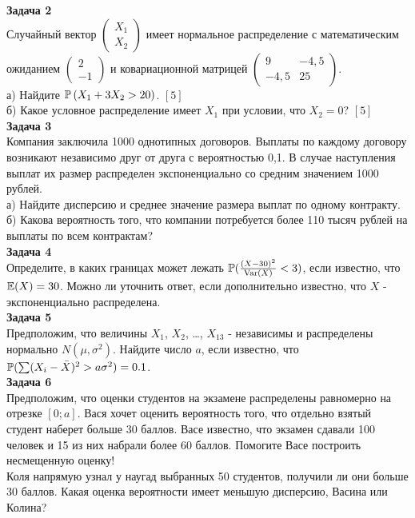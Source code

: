 \documentclass[12pt, a4paper]{article}\usepackage[]{graphicx}\usepackage[]{color}
\begin{document}
\textbf{Задача 2} \\ %
Случайный вектор  $\left(\begin{array}{c}
{X_{1} } \\ {X_{2} }
\end{array}\right)$  имеет нормальное распределение с
математическим ожиданием  $\left(\begin{array}{c} {2} \\ {-1}
\end{array}\right)$  и ковариационной матрицей
$\left(\begin{array}{cc} {9} & {-4,5} \\ {-4,5} & {25}
\end{array}\right)$. \\
а) Найдите  $\P\left(X_{1} +3X_{2} >20\right)$. $[5]$ \\
б) Какое условное распределение имеет $X_{1}$ при условии, что $X_{2}=0$? $[5]$ \\


\textbf{Задача 3} \\ %
Компания заключила 1000 однотипных договоров. Выплаты по каждому договору возникают независимо друг от друга с вероятностью 0,1. В случае наступления выплат их размер распределен экспоненциально со средним значением 1000 рублей. \\
а) Найдите дисперсию и среднее значение размера выплат по одному контракту. \\
б) Какова вероятность того, что компании потребуется более 110 тысяч рублей на выплаты по всем контрактам? \\

\textbf{Задача 4} \\ %
Определите, в каких границах может лежать $\P(\frac{(X-30)^{2}}{\Var(X)}<3)$, если известно, что $\E(X)=30$. Можно ли уточнить ответ, если дополнительно известно, что $X$ - экспоненциально распределена. \\

\textbf{Задача 5} \\ %
Предположим, что величины $X_{1}$, $X_{2}$, \ldots, $X_{13}$ - независимы и распределены нормально $N(\mu,\sigma^{2})$. Найдите число $a$, если известно, что $\P( \sum (X_{i}-\bar{X})^{2}>a\sigma^{2})=0.1$. \\

\textbf{Задача 6} \\
Предположим, что оценки студентов на экзамене распределены равномерно на отрезке $[0;a]$. Вася хочет оценить вероятность того, что отдельно взятый студент наберет больше 30 баллов. Васе известно, что экзамен сдавали 100 человек и 15 из них набрали более 60 баллов. Помогите Васе построить несмещенную оценку! \\
Коля напрямую узнал у наугад выбранных 50 студентов, получили ли они больше 30 баллов. Какая оценка вероятности имеет меньшую дисперсию, Васина или Колина? \\
\end{document}
